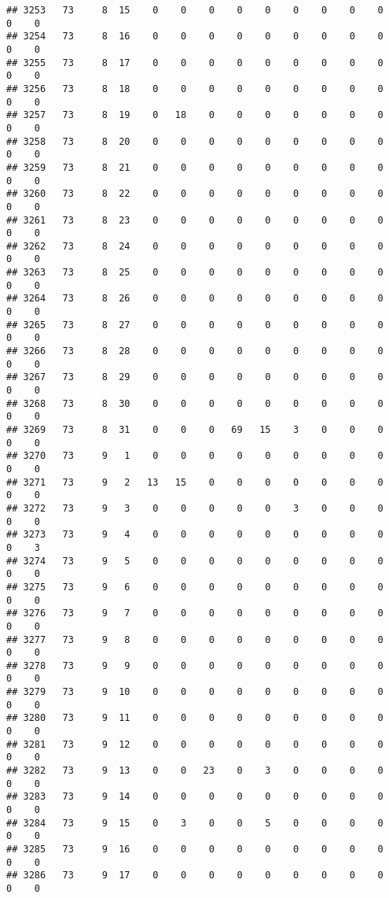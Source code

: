 \documentclass[]{article}
\begin{document}
\begin{verbatim}
## 3253   73     8  15    0    0    0    0    0    0    0    0    0    0    0
## 3254   73     8  16    0    0    0    0    0    0    0    0    0    0    0
## 3255   73     8  17    0    0    0    0    0    0    0    0    0    0    0
## 3256   73     8  18    0    0    0    0    0    0    0    0    0    0    0
## 3257   73     8  19    0   18    0    0    0    0    0    0    0    0    0
## 3258   73     8  20    0    0    0    0    0    0    0    0    0    0    0
## 3259   73     8  21    0    0    0    0    0    0    0    0    0    0    0
## 3260   73     8  22    0    0    0    0    0    0    0    0    0    0    0
## 3261   73     8  23    0    0    0    0    0    0    0    0    0    0    0
## 3262   73     8  24    0    0    0    0    0    0    0    0    0    0    0
## 3263   73     8  25    0    0    0    0    0    0    0    0    0    0    0
## 3264   73     8  26    0    0    0    0    0    0    0    0    0    0    0
## 3265   73     8  27    0    0    0    0    0    0    0    0    0    0    0
## 3266   73     8  28    0    0    0    0    0    0    0    0    0    0    0
## 3267   73     8  29    0    0    0    0    0    0    0    0    0    0    0
## 3268   73     8  30    0    0    0    0    0    0    0    0    0    0    0
## 3269   73     8  31    0    0    0   69   15    3    0    0    0    0    0
## 3270   73     9   1    0    0    0    0    0    0    0    0    0    0    0
## 3271   73     9   2   13   15    0    0    0    0    0    0    0    0    0
## 3272   73     9   3    0    0    0    0    0    3    0    0    0    0    0
## 3273   73     9   4    0    0    0    0    0    0    0    0    0    0    3
## 3274   73     9   5    0    0    0    0    0    0    0    0    0    0    0
## 3275   73     9   6    0    0    0    0    0    0    0    0    0    0    0
## 3276   73     9   7    0    0    0    0    0    0    0    0    0    0    0
## 3277   73     9   8    0    0    0    0    0    0    0    0    0    0    0
## 3278   73     9   9    0    0    0    0    0    0    0    0    0    0    0
## 3279   73     9  10    0    0    0    0    0    0    0    0    0    0    0
## 3280   73     9  11    0    0    0    0    0    0    0    0    0    0    0
## 3281   73     9  12    0    0    0    0    0    0    0    0    0    0    0
## 3282   73     9  13    0    0   23    0    3    0    0    0    0    0    0
## 3283   73     9  14    0    0    0    0    0    0    0    0    0    0    0
## 3284   73     9  15    0    3    0    0    5    0    0    0    0    0    0
## 3285   73     9  16    0    0    0    0    0    0    0    0    0    0    0
## 3286   73     9  17    0    0    0    0    0    0    0    0    0    0    0

\end{verbatim}
\end{document}
